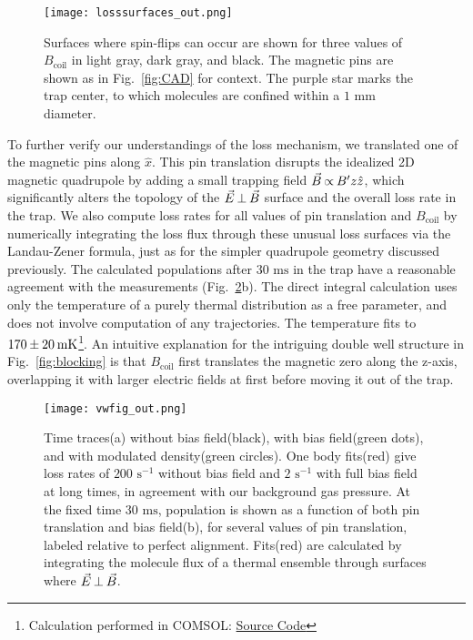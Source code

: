 \documentclass[%
 reprint,
 amsmath,amssymb,
 aps,
pra,
]{revtex4-1}
\newcommand{\bcl}{{$B_\text{coil}$}}
\newcommand{\epb}{{$\vec{E}\s {\perp}\s\vec{B}$}}
\newcommand{\s}{{\nobreak\hspace{.2em}}}
\begin{document}
\begin{figure}[tb]
\texttt{[image: losssurfaces\_out.png]}%
\caption{
Surfaces where spin-flips can occur are shown for three values of \bcl{} in light gray, dark gray, and black.
The magnetic pins are shown as in Fig.~\ref{fig:CAD} for context.
The purple star marks the trap center, to which molecules are confined within a \protect\raisebox{2.5px}{\texttildelow} $\!\!1\text{ mm}$ diameter.
\label{fig:LSurfs}}
\end{figure}

To further verify our understandings of the loss mechanism, we translated one of the magnetic pins along $\hat{x}$.
This pin translation disrupts the idealized 2D magnetic quadrupole by adding a small trapping field $\vec{B} \s {\propto}\s  B^\prime z\hat{z}$, which significantly alters the topology of the \epb{} surface and the overall loss rate in the trap. We also compute loss rates for all values of pin translation and \bcl{} by numerically integrating the loss flux through these unusual loss surfaces via the Landau-Zener formula, just as for the simpler quadrupole geometry discussed previously.  The calculated populations after $30\text{ ms}$ in the trap have a reasonable agreement with the measurements (Fig.~\ref{fig:WVplot}b).
The direct integral calculation uses only the temperature of a purely thermal distribution as a free parameter, and does not involve computation of any trajectories.
The temperature fits to $170\s {\pm}\s 20\s\text{mK}$\s\footnote{Calculation performed in COMSOL: \href{https://github.com/dreens/spin-flip-integration/}{Source Code}}.
An intuitive explanation for the intriguing double well structure in Fig.~\ref{fig:blocking} is that \bcl{} first translates the magnetic zero along the z-axis, overlapping it with larger electric fields at first before moving it out of the trap.

\begin{figure}[tb]
\texttt{[image: vwfig\_out.png]}%
\caption{
Time traces\s(a) without bias field\s(black), with bias field\s(green dots), and with modulated density\s(green circles).
One body fits\s(red) give loss rates of $200\text{ s}^{-1}$ without bias field and $2\text{ s}^{-1}$ with full bias field at long times, in agreement with our background gas pressure.
At the fixed time $30\text{ ms}$, population is shown as a function of both pin translation and bias field\s(b), for several values of pin translation, labeled relative to perfect alignment.
Fits\s(red) are calculated by integrating the molecule flux of a thermal ensemble through surfaces where \epb.
\label{fig:WVplot}}
\end{figure}
\end{document}
